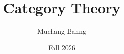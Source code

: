 \documentclass{article}
\begin{document}
\title{Category Theory}
\author{Muchang Bahng}
\date{Fall 2026}

\maketitle
\tableofcontents
\pagebreak



\end{document}
